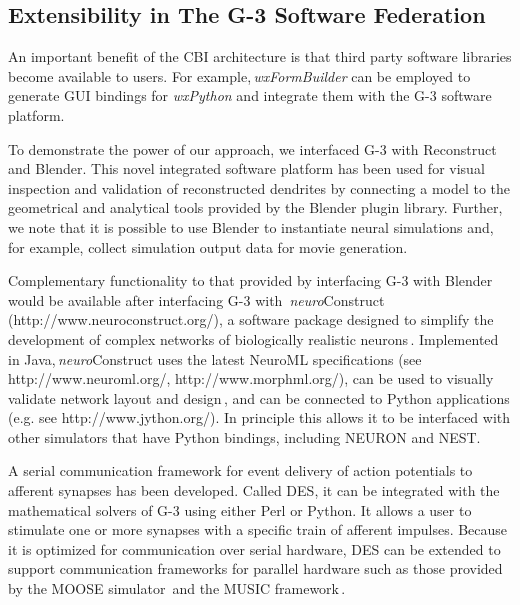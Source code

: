 \documentclass[10pt]{article}
\begin{document}
\subsection*{Extensibility in The G-3 Software Federation}

An important benefit of the CBI architecture is
that third party software libraries become available to users.  For
example,\,{\it wxFormBuilder} can be employed to generate GUI bindings for
{\it wxPython} and integrate them with the G-3 software platform.

To demonstrate the power of our approach, we
interfaced G-3 with Reconstruct and Blender. This novel integrated software
platform has been used for visual inspection and validation of
reconstructed dendrites by connecting a model to the geometrical and
analytical tools provided by the Blender plugin library.  Further, we
note that it is possible to use Blender to instantiate neural
simulations and, for example, collect simulation output data for
movie generation.  

Complementary functionality to that provided by interfacing G-3 with
Blender would be available after interfacing G-3 with\,{\it
  neuro}Construct (http://www.neuroconstruct.org/), a software package
designed to simplify the development of complex networks of
biologically realistic neurons\,\cite{gleeson10:neuroml,
  gleeson07}.  Implemented in Java,\,{\it neuro}Construct uses the
latest NeuroML specifications (see http://www.neuroml.org/,
http://www.morphml.org/), can be used to visually validate network
layout and design\,\cite{crook07:_morph}, and can be connected to
Python applications (e.g.  see http://www.jython.org/).  In principle
this allows it to be interfaced with other simulators that have Python
bindings, including NEURON and NEST.

A serial communication framework for event delivery of action
potentials to afferent synapses has been developed.  Called
DES, it can be integrated
with the mathematical solvers of G-3 using either Perl or Python. It allows a user to stimulate one or more synapses with a specific train of afferent impulses.
Because it is optimized for communication over serial hardware, DES
can be extended to support communication frameworks for parallel
hardware such as those provided by the MOOSE
simulator\,\cite{ray08:_pymoos} and the MUSIC
framework\,\cite{djurfeldt10:_run_time_inter_between_neuron}.
\end{document}
